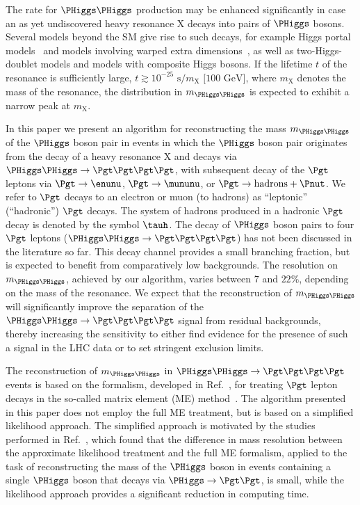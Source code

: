The rate for $\PHiggs\PHiggs$ production may be enhanced significantly in case an as yet undiscovered heavy resonance $\textrm{X}$ decays into pairs of $\PHiggs$ bosons.
Several models beyond the SM give rise to such decays, 
for example Higgs portal models~\cite{Englert:2011yb,No:2013wsa} and models involving warped extra dimensions~\cite{Randall:1999ee},
as well as two-Higgs-doublet models and models with composite Higgs bosons.
If the lifetime $t$ of the resonance is sufficiently large, $t \gtrsim 10^{-25}\textrm{~s}/m_{\textrm{X}}\textrm{~[100~GeV]}$, 
where $m_{\textrm{X}}$ denotes the mass of the resonance, 
the distribution in $m_{\PHiggs\PHiggs}$ is expected to exhibit a narrow peak at $m_{\textrm{X}}$.

In this paper we present an algorithm for reconstructing the mass $m_{\PHiggs\PHiggs}$ of the $\PHiggs$ boson pair 
in events in which the $\PHiggs$ boson pair originates from the decay of a heavy resonance $\textrm{X}$ 
and decays via $\PHiggs\PHiggs \to \Pgt\Pgt\Pgt\Pgt$,
with subsequent decay of the $\Pgt$ leptons via $\Pgt \to \enunu$, $\Pgt \to \mununu$, or $\Pgt \to \textrm{hadrons} + \Pnut$.
We refer to $\Pgt$ decays to an electron or muon (to hadrons) as ``leptonic'' (``hadronic'') $\Pgt$ decays.
The system of hadrons produced in a hadronic $\Pgt$ decay is denoted by the symbol $\tauh$.
The decay of $\PHiggs$ boson pairs to four $\Pgt$ leptons ($\PHiggs\PHiggs \to \Pgt\Pgt\Pgt\Pgt$) has not been discussed in the literature so far.
This decay channel provides a small branching fraction, but is expected to benefit from comparatively low backgrounds.
The resolution on $m_{\PHiggs\PHiggs}$, achieved by our algorithm, varies between $7$ and $22\%$,
depending on the mass of the resonance.
We expect that the reconstruction of $m_{\PHiggs\PHiggs}$ will significantly improve 
the separation of the $\PHiggs\PHiggs \to \Pgt\Pgt\Pgt\Pgt$ signal from residual backgrounds,
thereby increasing the sensitivity to either find evidence for the presence of such a signal in the LHC data or to set stringent exclusion limits.

The reconstruction of $m_{\PHiggs\PHiggs}$ in $\PHiggs\PHiggs \to \Pgt\Pgt\Pgt\Pgt$ events is based on the formalism,
developed in Ref.~\cite{SVfitMEM}, for treating $\Pgt$ lepton decays in the so-called matrix element (ME) method~\cite{Kondo:1988yd,Kondo:1991dw}.
The algorithm presented in this paper does not employ the full ME treatment,
but is based on a simplified likelihood approach.
The simplified approach is motivated by the studies performed in Ref.~\cite{SVfitMEM}, 
which found that the difference in mass resolution between the approximate likelihood treatment and the full ME formalism,
applied to the task of reconstructing the mass of the $\PHiggs$ boson in events containing a single $\PHiggs$ boson that decays via $\PHiggs \to \Pgt\Pgt$,
is small, while the likelihood approach provides a significant reduction in computing time.

